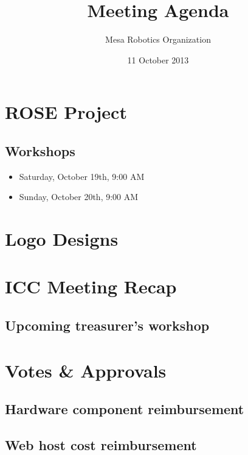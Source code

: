\documentclass{article}
\begin{document}

\title{Meeting Agenda}
\author{Mesa Robotics Organization}
\date{11 October 2013}

\maketitle

\section{ROSE Project}
\subsection{Workshops}
\begin{itemize}
    \item Saturday, October 19th, 9:00 AM
    \item Sunday, October 20th, 9:00 AM
\end{itemize}

\section{Logo Designs}

\section{ICC Meeting Recap}
\subsection{Upcoming treasurer's workshop}

\section{Votes \& Approvals}
\subsection{Hardware component reimbursement}
\subsection{Web host cost reimbursement}

\end{document}
